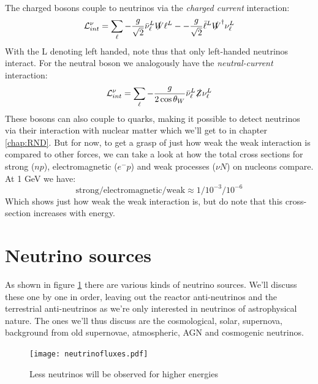 The charged bosons couple to neutrinos via the \textit{charged current} interaction:
\begin{equation}
	\mathcal{L}_{int}^\nu = \sum_\ell -\frac{g}{\sqrt{2}} \bar{\nu}_\ell^L\slashed{W}\ell^L - -\frac{g}{\sqrt{2}} \bar{\ell}^L\slashed{W}^\dagger\nu_\ell^L
\end{equation}
With the L denoting left handed, note thus that only left-handed neutrinos interact. For the
neutral boson we analogously have the \textit{neutral-current} interaction:
\begin{equation}
	\mathcal{L}_{int}^\nu = \sum_\ell -\frac{g}{2\cos\theta_W} \bar{\nu}_\ell^L\slashed{Z}\nu_\ell^L
\end{equation}
These bosons can also couple to quarks, making it possible to detect neutrinos via their interaction with nuclear matter
which we'll get to in chapter \ref{chap:RND}. But for now, to get a grasp of just how weak the weak interaction is
compared to other forces, we can take a look at how the total cross sections for strong ($np$), electromagnetic ($e^- p$) and weak processes ($\nu N$) on nucleons 
compare. At 1 GeV we have\cite{garcia2007subatomic}:
\begin{equation}
	\text{strong/electromagnetic/weak} \approx 1/10^{-3}/10^{-6}
\end{equation}
Which shows just how weak the weak interaction is, but do note that this cross-section increases with energy.
\section{Neutrino sources}
As shown in figure \ref{figure:Neutrino fluxes} there are various kinds of
neutrino sources. We'll discuss these one by one in order, leaving out the
reactor anti-neutrinos and the terrestrial anti-neutrinos as we're only
interested in neutrinos of astrophysical nature. The ones we'll thus discuss
are the cosmological, solar, supernova, background from old supernovae,
atmospheric, AGN and cosmogenic neutrinos.
\begin{figure}
	\centering
	\texttt{[image: neutrinofluxes.pdf]}
	\caption{Less neutrinos will be observed for higher energies }
	\label{figure:Neutrino fluxes}
\end{figure}
